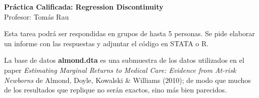 \documentclass{article}
\begin{document}
\begin{center}


\LARGE{\textbf{Práctica Calificada: Regression Discontinuity}}\\

Profesor: Tomás Rau

\end{center}

Esta tarea podrá ser respondidas en grupos de hasta 5 personas. Se pide elaborar un informe con las respuestas y adjuntar el código en STATA o R.

\bigskip

La base de datos \textbf{almond.dta} es una submuestra de los datos utilizados en el paper \textit{Estimating Marginal Returns to Medical Care: Evidence from At-risk Newborns} de Almond, Doyle, Kowalski \& Williams (2010); de modo que muchos de los resultados que replique no serán exactos, sino más bien parecidos.
\end{document}
